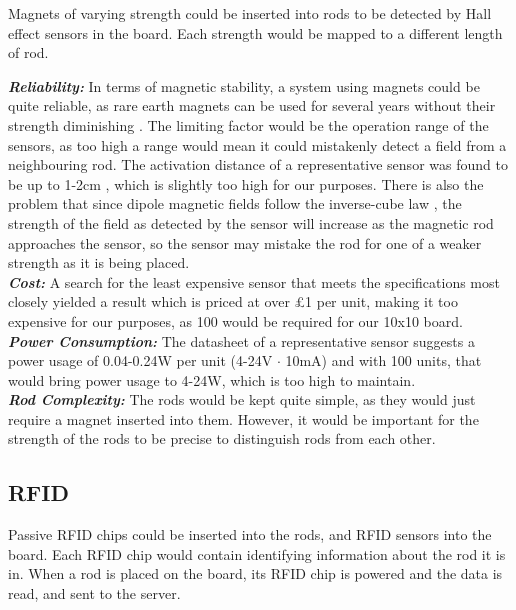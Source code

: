 Magnets of varying strength could be inserted into rods to be detected by Hall effect sensors in the board. Each strength would be mapped to a different length of rod. \\

{
\setlength{\parindent}{0pt} 

\textbf{\textit{Reliability:}} In terms of magnetic stability, a system using magnets could be quite reliable, as rare earth magnets can be used for several years without their strength diminishing \cite{Permanen88:online}. The limiting factor would be the operation range of the sensors, as too high a range would mean it could mistakenly detect a field from a neighbouring rod. The activation distance of a representative sensor was found to be up to 1-2cm \cite{47017pdf16:online}, which is slightly too high for our purposes. There is also the problem that since dipole magnetic fields follow the inverse-cube law \cite{Theinver11:online}, the strength of the field as detected by the sensor will increase as the magnetic rod approaches the sensor, so the sensor may mistake the rod for one of a weaker strength as it is being placed. \\

\textbf{\textit{Cost:}} A search for the least expensive sensor that meets the specifications most closely yielded a result \cite{A1318LUA39:online} which is priced at over £1 per unit, making it too expensive for our purposes, as 100 would be required for our 10x10 board. \\

\textbf{\textit{Power Consumption:}} The datasheet of a representative sensor \cite{47017pdf16:online} suggests a power usage of 0.04-0.24W per unit (4-24V $\cdot$ 10mA) and with 100 units, that would bring power usage to 4-24W, which is too high to maintain.   \\

\textbf{\textit{Rod Complexity:}} The rods would be kept quite simple, as they would just require a magnet inserted into them. However, it would be important for the strength of the rods to be precise to distinguish rods from each other.\\
}


\subsection{RFID}
\label{rfid}

Passive RFID chips could be inserted into the rods, and RFID sensors into the board. Each RFID chip would contain identifying information about the rod it is in. When a rod is placed on the board, its RFID chip is powered and the data is read, and sent to the server. \\

